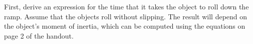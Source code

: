 \documentclass[11pt,letterpaper]{article}
\begin{document}


First, derive an expression for the time that it takes the object to roll down the ramp. Assume that the objects roll without slipping. The result will depend on the object's moment of inertia, which can be computed using the equations on page 2 of the handout.
\end{document}
